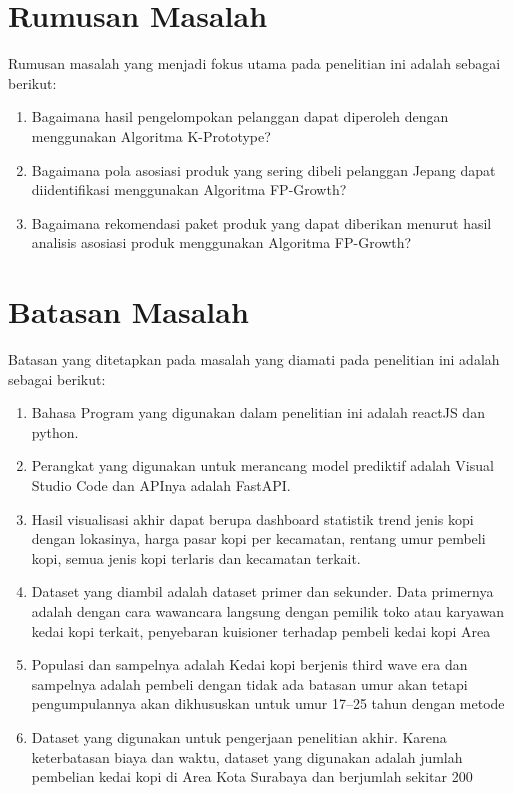 \documentclass[a4paper,12pt]{report}
\begin{document}
\section{Rumusan Masalah}
Rumusan masalah yang menjadi fokus utama pada penelitian ini adalah sebagai berikut:
\begin{enumerate}
  \item Bagaimana hasil pengelompokan pelanggan dapat diperoleh dengan menggunakan Algoritma K-Prototype?
  \item Bagaimana pola asosiasi produk yang sering dibeli pelanggan Jepang dapat diidentifikasi menggunakan Algoritma FP-Growth?
  \item Bagaimana rekomendasi paket produk yang dapat diberikan menurut hasil analisis asosiasi produk menggunakan Algoritma FP-Growth?
\end{enumerate}

\section{Batasan Masalah}
Batasan yang ditetapkan pada masalah yang diamati pada penelitian ini adalah sebagai berikut:
\begin{enumerate}
  \item Bahasa Program yang digunakan dalam penelitian ini adalah reactJS dan python.
  \item Perangkat yang digunakan untuk merancang model prediktif adalah Visual Studio Code dan APInya adalah FastAPI.
  \item Hasil visualisasi akhir dapat berupa dashboard statistik trend jenis kopi dengan lokasinya, harga pasar kopi per kecamatan, rentang umur pembeli kopi, semua jenis kopi terlaris dan kecamatan terkait.
  \item Dataset yang diambil adalah dataset primer dan sekunder. Data primernya adalah dengan cara wawancara langsung dengan pemilik toko atau karyawan kedai kopi terkait, penyebaran kuisioner terhadap pembeli kedai kopi Area
  \item Populasi dan sampelnya adalah Kedai kopi berjenis third wave era dan sampelnya adalah pembeli dengan tidak ada batasan umur akan tetapi pengumpulannya akan dikhususkan untuk umur 17--25 tahun dengan metode
  \item Dataset yang digunakan untuk pengerjaan penelitian akhir. Karena keterbatasan biaya dan waktu, dataset yang digunakan adalah jumlah pembelian kedai kopi di Area Kota Surabaya dan berjumlah sekitar 200
\end{enumerate}
\end{document}
